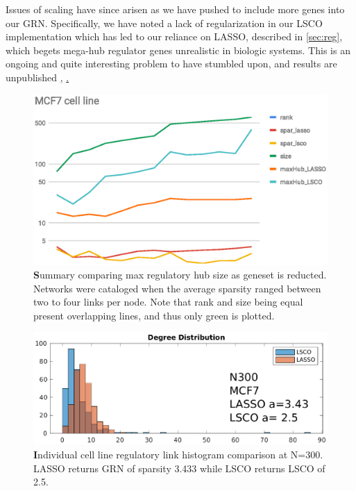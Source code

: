 Issues of scaling have since arisen as we have pushed to include more genes into our GRN. Specifically, we have noted a lack of regularization in our LSCO implementation which has led to our reliance on LASSO, described in \cref{sec:reg}, which begets mega-hub regulator genes unrealistic in biologic systems. This is an ongoing and quite interesting problem to have stumbled upon, and results are unpublished \href{fig:scaling}, \href{fig:hubiness}.
\begin{figure}[H]
\centering
\includegraphics[width=.75\linewidth]{3/MCF7_cell_line.eps}
\caption{{\textbf Summary comparing max regulatory hub size as geneset is reducted.} Networks were cataloged when the average sparsity ranged between two to four links per node. Note that rank and size being equal present overlapping lines, and thus only green is plotted.
}
\label{fig:scaling}
\end{figure}

\begin{figure}[H]
\centering
\includegraphics[width=.75\linewidth]{3/hubineess.eps}
\caption{{\textbf Individual cell line regulatory link histogram comparison at N=300}. LASSO returns GRN of sparsity 3.433 while LSCO returns LSCO of 2.5.
}
\label{fig:hubiness}
\end{figure}




